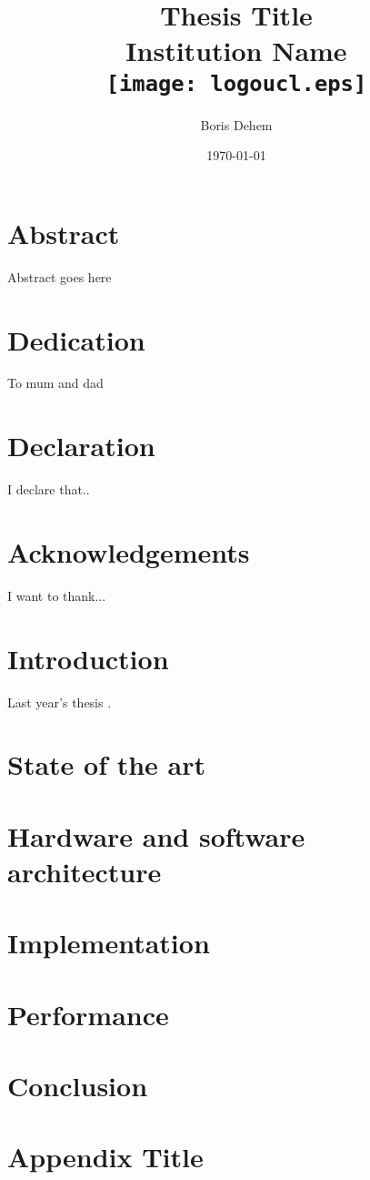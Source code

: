 \documentclass[12pt,a4paper,twoside]{report}
\title{
	{Thesis Title}\\
	{\large Institution Name}\\
	{\texttt{[image: logoucl.eps]}}
}
\author{Boris Dehem}
\date{\today}
\begin{document}


\chapter*{Abstract}
Abstract goes here

\chapter*{Dedication}
To mum and dad

\chapter*{Declaration}
I declare that..

\chapter*{Acknowledgements}
I want to thank...

\tableofcontents

\chapter{Introduction}

Last year's thesis \cite{jacquesleclere}.

\chapter{State of the art}


\chapter{Hardware and software architecture}


\chapter{Implementation}


\chapter{Performance}


\chapter{Conclusion}


\printbibliography

\appendix
\chapter{Appendix Title}

\end{document}
